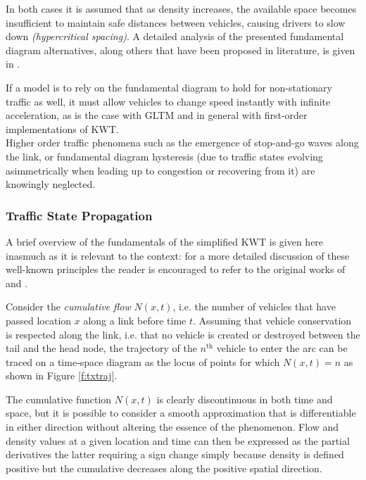 In both cases it is assumed that as density increases, the available space becomes insufficient to maintain safe distances between vehicles, causing drivers to slow down \emph{(hypercritical spacing)}. A detailed analysis of the presented fundamental diagram alternatives, along others that have been proposed in literature, is given in \citep{tiddi2012models}.

If a model is to rely on the fundamental diagram to hold for non-stationary traffic as well, it must allow vehicles to change speed instantly with infinite acceleration, as is the case with GLTM and in general with first-order implementations of KWT. \\
Higher order traffic phenomena such as the emergence of stop-and-go waves along the link, or fundamental diagram hysteresis (due to traffic states evolving asimmetrically when leading up to congestion or recovering from it) are knowingly neglected.

\subsubsection{Traffic State Propagation}
A brief overview of the fundamentals of the simplified KWT is given here inasmuch as it is relevant to the context: for a more detailed discussion of these well-known principles the reader is encouraged to refer to the original works of \cite{yperman2007link} and \cite{gentile2010general}.

Consider the \emph{cumulative flow} $N(x,t)$,  i.e. the number of vehicles that have passed location $x$ along a link before time $t$. Assuming that vehicle conservation is respected along the link, i.e. that no vehicle is created or destroyed between the tail and the head node, the trajectory of the $n^{\mathrm{th}}$ vehicle to enter the arc can be traced on a time-space diagram as the locus of points for which $N(x,t) = n$ as shown in Figure \ref{f:txtraj}.


The cumulative function $N(x,t)$ is clearly discontinuous in both time and space, but it is possible to consider a smooth approximation that is differentiable in either direction without altering the essence of the phenomenon. Flow and density values at a given location and time can then be expressed as the partial derivatives
the latter requiring a sign change simply because density is defined positive but the cumulative decreases along the positive spatial direction.

